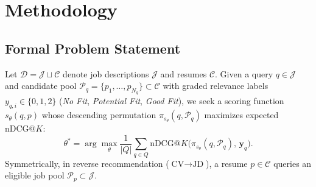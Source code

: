 \section{Methodology}

\subsection{Formal Problem Statement}
Let $\mathcal{D} = \mathcal{J} \sqcup \mathcal{C}$ denote job descriptions $\mathcal{J}$ and resumes $\mathcal{C}$. Given a query $q \in \mathcal{J}$ and candidate pool $\mathcal{P}_q = \{p_1, \dots, p_{N_q}\} \subset \mathcal{C}$ with graded relevance labels $y_{q,i} \in \{0, 1, 2\}$ (\textit{No Fit}, \textit{Potential Fit}, \textit{Good Fit}), we seek a scoring function $s_\theta(q, p)$ whose descending permutation $\pi_{s_\theta}(q, \mathcal{P}_q)$ maximizes expected $\text{nDCG}@K$:
\begin{equation}
    \theta^* = \arg\max_\theta \frac{1}{|Q|} \sum_{q \in Q} \text{nDCG}@K\Big( \pi_{s_\theta}(q, \mathcal{P}_q), \, \mathbf{y}_q \Big).
    \label{eq:objective}
\end{equation}
Symmetrically, in reverse recommendation ($\text{CV} \rightarrow \text{JD}$), a resume $p \in \mathcal{C}$ queries an eligible job pool $\mathcal{P}_p \subset \mathcal{J}$.

